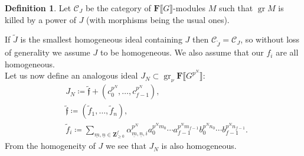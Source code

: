 \documentclass[11pt, oneside]{article}
\DeclareMathOperator{\gr}{gr}
\theoremstyle{definition}
\newtheorem{definition}{Definition}
\begin{document}
	\begin{definition}
		Let $\mathcal C_J$ be the category of $\mathbf F\llbracket G\rrbracket$-modules $M$ such that $\gr M$ is killed by a power of $J$ (with morphisms being the usual ones).
	\end{definition}
	If $\tilde J$ is the smallest homogeneous ideal containing $J$ then $\mathcal C_{\tilde J}=\mathcal C_J$, so without loss of generality we assume $J$ to be homogeneous. We also assume that our $f_i$ are all homogeneous.\\
	Let us now define an analogous ideal $J_N\subset\gr_\nu\mathbf F\llbracket G^{p^N}\rrbracket$:
	\begin{equation*}\label{JN}
		\begin{aligned}
			&J_N\coloneqq\tilde{\mathfrak f}+(c_0^{p^N},\dots,c_{f-1}^{p^N}),\\
			&\tilde{\mathfrak f}\coloneqq(\tilde f_1,\dots,\tilde f_n),\\
			&\tilde f_i\coloneqq\sum_{\underline m,\underline n\in\mathbf Z_{\geq0}^f}\alpha_{\underline m,\underline n,i}^{p^N}a_0^{p^Nm_0}\cdots a_{f-1}^{p^Nm_{f-1}}b_0^{p^Nn_0}\cdots b_{f-1}^{p^Nn_{f-1}}.
		\end{aligned}
	\end{equation*}
	From the homogeneity of $J$ we see that $J_N$ is also homogeneous.
\end{document}
